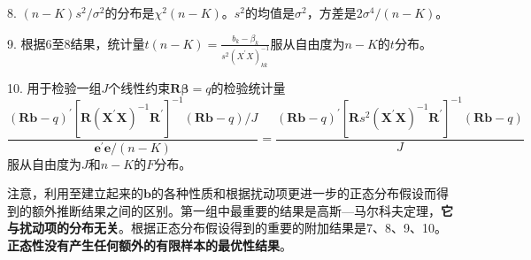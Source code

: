 8. $ (n-K) s^{2} / \sigma^{2} $的分布是$ \chi^{2}(n-K) $。$ s^{2} $的均值是$ \sigma^{2} $，方差是$ 2 \sigma^{4} /(n-K) $。

9. 根据6至8结果，统计量$ t(n-K)=\frac{b_{k}-\beta_{k}}{s^{2}\left(X^{\prime} X\right)_{k k}^{-1}} $服从自由度为$ n-K $的$ t $分布。
	
10. 用于检验一组$ J $个线性约束$ \boldsymbol{R\beta} = q $的检验统计量	
$$ \frac{(\boldsymbol{Rb}-q)^{\prime}\left[\boldsymbol{R}\left(\boldsymbol{X}^{\prime} \boldsymbol{X}\right)^{-1} \boldsymbol{R}^{\prime}\right]^{-1}(\boldsymbol{R b}-q) / J}{\boldsymbol{e}^{\prime} \boldsymbol{e} /(n-K)}=\frac{(\boldsymbol{Rb}-q)^{\prime}\left[\boldsymbol{R} s^{2}\left(\boldsymbol{X}^{\prime} \boldsymbol{X}\right)^{-1} \boldsymbol{R}^{\prime}\right]^{-1}(\boldsymbol{Rb}-q)}{J} $$
服从自由度为$ J $和$ n-K $的$ F $分布。	

注意，利用\uppercase\expandafter{}至\uppercase\expandafter{}建立起来的$ \boldsymbol{b} $的各种性质和根据扰动项更进一步的正态分布假设而得到的额外推断结果之间的区别。第一组中最重要的结果是高斯—马尔科夫定理，\textbf{它与扰动项的分布无关}。根据正态分布假设得到的重要的附加结果是7、8、9、10。\textbf{正态性没有产生任何额外的有限样本的最优性结果}。
